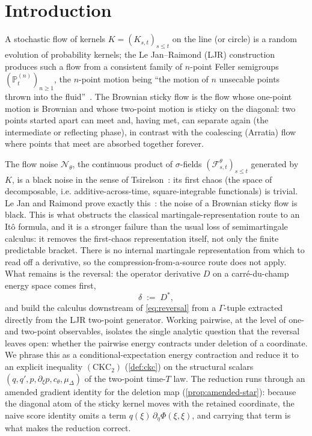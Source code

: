 \documentclass[reqno,final,11pt]{amsart}
\theoremstyle{plain}
\theoremstyle{definition}
\theoremstyle{remark}
\newcommand{\Prob}{\mathbb P}
\newcommand{\cF}{\mathcal F}
\newcommand{\cN}{\mathcal N}
\newcommand{\muD}{\mu_{\Delta}}
\newcommand{\cth}{c_{\theta}}
\newcommand{\CKC}{(\mathrm{CKC}_{2})}
\begin{document}
\maketitle

\section{Introduction}\label{sec:intro}

A stochastic flow of kernels $K=(K_{s,t})_{s\le t}$ on the line (or
circle) is a random evolution of probability kernels; the Le Jan--Raimond
(LJR) construction~\citep{LJR-FCN} produces such a flow from a consistent
family of $n$-point Feller semigroups $(\Prob^{(n)}_t)_{n\ge1}$, the
$n$-point motion being ``the motion of $n$ unsecable points thrown into the
fluid''~\citep[\S1]{LJR-FCN}. The Brownian sticky flow is the flow
whose one-point motion is Brownian and whose two-point motion is sticky on
the diagonal: two points started apart can meet and, having met, can
separate again (the intermediate or reflecting phase), in
contrast with the coalescing (Arratia) flow where points that meet are
absorbed together forever.

The flow noise $\cN_\theta$, the continuous product of $\sigma$-fields
$(\cF^{\theta}_{s,t})_{s\le t}$ generated by $K$, is a black noise
in the sense of Tsirelson~\citep{Tsirelson-StFlour,Tsirelson-Survey}: its first
chaos (the space of decomposable, i.e.
additive-across-time, square-integrable functionals) is trivial. Le Jan and
Raimond prove exactly this~\citep{LJR-circle-noise}: the noise of a Brownian
sticky flow is black. This is what obstructs the classical
martingale-representation route to an It\^o formula, and it is a stronger failure
than the usual loss of semimartingale calculus: it removes the first-chaos
representation itself, not only the finite predictable bracket. There is no
internal martingale representation from which to read off a derivative, so the
compression-from-a-source route does not apply. What remains is the
reversal: the operator
derivative $D$ on a carr\'e-du-champ energy space comes first,
\begin{equation}\label{eq:reversal}
  \delta\;:=\;D^{*},
\end{equation}
and build the calculus downstream of \eqref{eq:reversal} from a
$\Gamma$-tuple extracted directly from the LJR two-point generator. Working
pairwise, at the level of one- and two-point observables, isolates the single
analytic question that the reversal leaves open: whether the pairwise energy
contracts under deletion of a coordinate. We phrase this as a
conditional-expectation energy contraction and reduce it to an explicit inequality
$\CKC$ (\cref{def:ckc}) on the structural scalars
$(q,q',p,\partial_\xi p,\cth,\muD)$ of the two-point time-$T$ law. The reduction
runs through an amended gradient identity for the deletion map
(\cref{prop:amended-star}): because the diagonal atom of the sticky kernel moves
with the retained coordinate, the naive score identity omits a term
$q(\xi)\,\partial_\eta\Phi(\xi,\xi)$, and carrying that term is what
makes the reduction correct.
\end{document}
